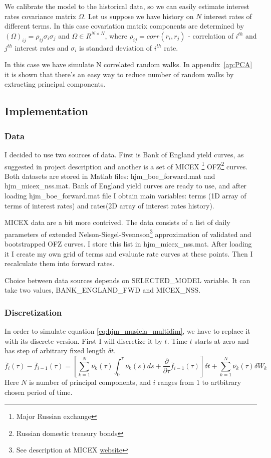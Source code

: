 \documentclass[11pt]{article} %
\begin{document}
We calibrate the model to the historical data, so we can easily estimate interest rates covariance matrix $\Omega$. Let us suppose we have history on $N$ interest rates of different terms. In this case covariation matrix components are determined by $(\Omega)_{ij} = \rho_{ij}\sigma_{i}\sigma_{j}$ and $\Omega \in R^{N \times N}$, where $\rho_{ij} = corr(r_i,r_j)$ - correlation of $i^{th}$ and $j^{th}$ interest rates and $\sigma_i$ is standard deviation of $i^{th}$ rate.

In this case we have simulate N correlated random walks. In appendix~\ref{ap:PCA} it is shown that there's an easy way to reduce number of random walks by extracting principal components.


\subsection{Implementation}
\subsubsection{Data}
I decided to use two sources of data. First is Bank of England yield curves, as suggested in project description and another is a set of MICEX \footnote{Major Russian exchange} OFZ\footnote{Russian domestic treasury bonds} curves. 
Both datasets are stored in Matlab files: hjm\_boe\_forward.mat and hjm\_micex\_nss.mat.
Bank of England yield curves are ready to use, and after loading hjm\_boe\_forward.mat file I obtain main variables: terms (1D array of terms of interest rates) and rates(2D array of interest rates history). 

MICEX data are a bit more contrived. The data consists of a list of daily parameters of extended Nelson-Siegel-Svennson\footnote{See description at MICEX \href{http://rts.micex.ru/a80}{website}} approximation of validated and bootstrapped OFZ curves. I store this list in hjm\_micex\_nss.mat. After loading it I create my own grid of terms and evaluate rate curves at these points. Then I recalculate them into forward rates.

Choice between data sources depends on SELECTED\_MODEL variable. It can take two values, BANK\_ENGLAND\_FWD and MICEX\_NSS.

\subsubsection{Discretization}
In order to simulate equation \eqref{eq:hjm_musiela_multidim}, we have to replace it with its discrete version. First I will discretize it by $t$. Time $t$ starts at zero and has step of arbitrary fixed length $\delta t$.
\begin{equation}
\bar{f}_i(\tau) - \bar{f}_{i-1}(\tau) = \left[\sum_{k=1}^N\bar{\nu_k}(\tau)\int_{0}^{\tau}\bar{\nu_k}(s)ds+ \frac{\partial}{\partial \tau}\bar{f}_{i-1}(\tau)\right]\delta t + \sum_{k=1}^N\bar{\nu_k}(\tau)\delta W_{k}
\end{equation}
Here $N$ is number of principal components, and $i$ ranges from $1$ to artbitrary chosen period of time.
\end{document}
